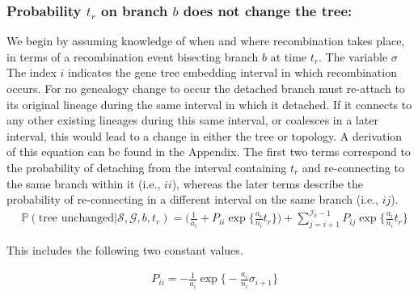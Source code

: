 \documentclass[11pt]{article}
\begin{document}
\subsubsection{Probability $t_r$ on branch $b$ does not change the tree:}
We begin by assuming knowledge of when and where recombination takes place, in terms 
of a recombination event bisecting branch $b$ at time $t_r$. The variable $\sigma$ 
The index $i$ indicates the gene tree embedding interval in which recombination occurs.
For no genealogy change to occur the detached branch must re-attach to its original 
lineage during the same interval in which it detached.
If it connects to any other existing lineages during this same interval, 
or coalesces in a later interval, this would lead to a change in either the 
tree or topology. A derivation of this equation can be found in the Appendix.
The first two terms correspond to the probability of detaching from the interval containing $t_r$ and 
re-connecting to the same branch within it (i.e., $ii$), whereas the 
later terms describe the probability of re-connecting in a different interval on the same branch (i.e., $ij$).
\begin{equation}
\begin{aligned}
	&\mathbb{P}(\text{tree unchanged} | \mathcal{S},\mathcal{G},b,t_r) = 
	\bigg(\frac{1}{a_i} +P_{ii} \exp \bigg\{\frac{a_i}{n_i}t_r\bigg\}\bigg) + 
	\sum_{j=i+1}^{\mathcal{I}_b - 1} P_{ij} \exp\bigg\{\frac{a_i}{n_i}t_r\bigg\} 
\end{aligned}
\end{equation}

\noindent This includes the following two constant values.

\begin{equation}
\begin{aligned}
	&P_{ii} = - \frac{1}{a_i} \exp \bigg\{-\frac{a_i}{n_i}\sigma_{i + 1} \bigg\} 	
\end{aligned}
\end{equation}
\end{document}
